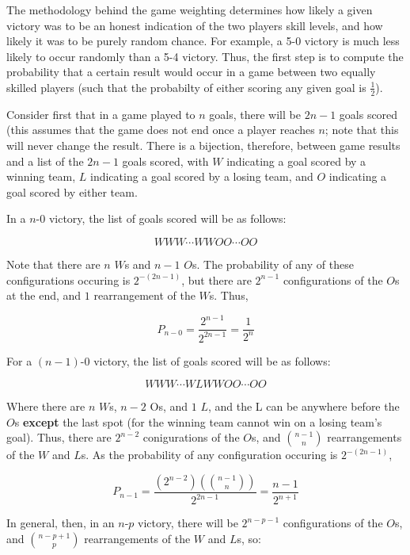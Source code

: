\documentclass[12pt, letterpaper]{article}
\begin{document}
\par The methodology behind the game weighting determines how likely a given victory was to be an honest indication of the two players skill levels, and how likely it was to be purely random chance.  For example, a 5-0 victory is much less likely to occur randomly than a 5-4 victory.  Thus, the first step is to compute the probability that a certain result would occur in a game between two equally skilled players (such that the probabilty of either scoring any given goal is $\frac{1}{2}$).

\par Consider first that in a game played to $n$ goals, there will be $2n-1$ goals scored (this assumes that the game does not end once a player reaches $n$; note that this will never change the result.  There is a bijection, therefore, between game results and a list of the $2n-1$ goals scored, with $W$ indicating a goal scored by a winning team, $L$ indicating a goal scored by a losing team, and $O$ indicating a goal scored by either team.

\par In a $n$-$0$ victory, the list of goals scored will be as follows:

$$ WWW\cdots WWOO\cdots OO $$

\par Note that there are $n$ $W$s and $n-1$ $O$s.  The probability of any of these configurations occuring is $2^{-(2n-1)}$, but there are $2^{n-1} $ configurations of the $O$s at the end, and $1$ rearrangement of the $W$s.  Thus,

$$ P_{n-0} = \frac{2^{n-1}}{2^{2n-1}} = \frac{1}{2^{n}} $$

\par For a $(n-1)$-$0$ victory, the list of goals scored will be as follows:

$$ WWW\cdots WLWWOO\cdots OO $$

\par Where there are $n$ $W$s, $n-2$ Os, and $1$ $L$, and the L can be anywhere before the $O$s \textbf{except} the last spot (for the winning team cannot win on a losing team's goal).  Thus, there are $2^{n-2}$ conigurations of the $O$s, and ${{n-1} \choose n}$ rearrangements of the $W$ and $L$s.  As the probability of any configuration occuring is $2^{-(2n-1)}$,

$$ P_{n-1} = \frac{(2^{n-2})({{n-1} \choose n})}{2^{2n-1}} = \frac{n-1}{2^{n+1}} $$

\par In general, then, in an $n$-$p$ victory, there will be $2^{n-p-1}$ configurations of the $O$s, and ${{n-p+1} \choose p}$ rearrangements of the $W$ and $L$s, so:
\end{document}
